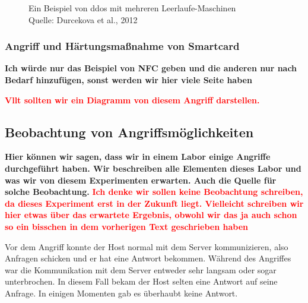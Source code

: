 \begin{figure}[H]
  \caption{Ein Beispiel von \acrfull{ddos} mit mehreren Leerlaufe-Maschinen
  \\ Quelle: Durcekova et al., 2012}
  \label{fig:VDSD}
\end{figure}

\subsubsection{Angriff und Härtungsmaßnahme von Smartcard}
\textbf{Ich würde nur das Beispiel von NFC geben und die anderen nur nach Bedarf hinzufügen, sonst werden wir hier
viele Seite haben}

\textcolor{red}{\textbf{Vllt sollten wir ein Diagramm von diesem Angriff darstellen.}}


\subsection{Beobachtung von Angriffsmöglichkeiten}
\textbf{Hier können wir sagen, dass wir in einem Labor einige Angriffe durchgeführt haben. Wir beschreiben alle Elementen
dieses Labor und was wir von diesem Experimenten erwarten. Auch die Quelle für solche Beobachtung.}
\textcolor{red}{\textbf{Ich denke wir sollen keine Beobachtung schreiben, da dieses Experiment erst in der Zukunft liegt. 
Vielleicht schreiben wir hier etwas über das erwartete Ergebnis, obwohl wir das ja auch schon so ein bisschen in dem vorherigen Text geschrieben haben}}

Vor dem Angriff konnte der Host normal mit dem Server kommunizieren, also Anfragen schicken und er hat eine Antwort bekommen.
Während des Angriffes war die Kommunikation mit dem Server entweder sehr langsam oder sogar unterbrochen. In diesem Fall
bekam der Host selten eine Antwort auf seine Anfrage. In einigen Momenten gab es überhaubt keine Antwort. 

